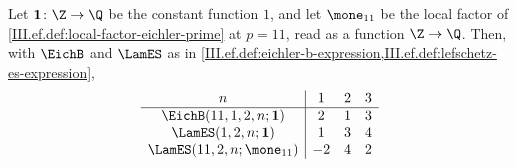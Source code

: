 Let $\mathbf 1\colon\Z\to\Q$ be the constant function $1$, and let $\mone_{11}$ be the local factor of \cref{III.ef.def:local-factor-eichler-prime} at
$p=11$, read as a function $\Z\to\Q$. Then, with $\EichB$ and $\LamES$ as in \cref{III.ef.def:eichler-b-expression,III.ef.def:lefschetz-es-expression},
\[
\begin{array}{c|ccc}
  n & 1 & 2 & 3\\\hline
  \EichB(11,1,2,n;\mathbf 1) & 2 & 1 & 3\\
  \LamES(1,2,n;\mathbf 1) & 1 & 3 & 4\\
  \LamES(11,2,n;\mone_{11}) & -2 & 4 & 2
\end{array}
\]
